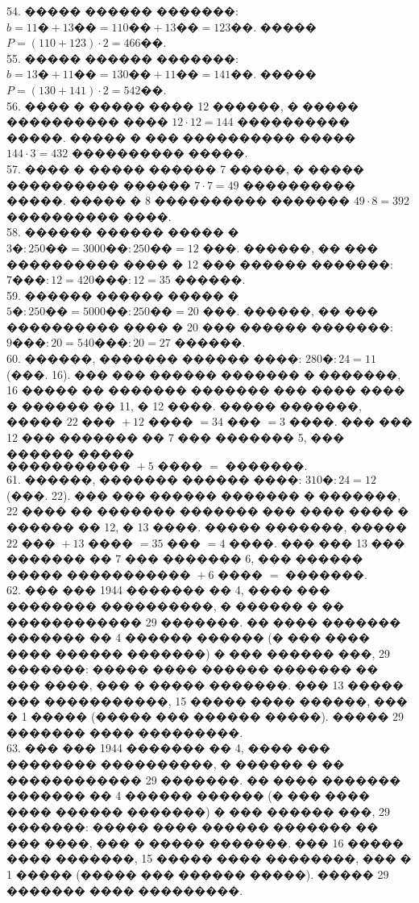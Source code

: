 \documentclass[12pt]{article}
\begin{document}
54. ����� ������ �������: $b=11\text{�}+13\text{��}=110\text{��}+13\text{��}=123$��. ����� $P=(110+123)\cdot2=466$��.\\
55. ����� ������ �������: $b=13\text{�}+11\text{��}=130\text{��}+11\text{��}=141$��. ����� $P=(130+141)\cdot2=542$��.\\
56. ���� � ����� ���� 12 ������, � ����� ���������� ���� $12\cdot12=144$ ���������� �����. ����� � ��� ���������� ����� $144\cdot3=432$ ���������� �����.\\
57. ���� � ����� ������ 7 �����, � ����� ���������� ������ $7\cdot7=49$ ���������� �����. ����� � 8 ���������� ������� $49\cdot8=392$ ���������� ����.\\
58. ������ ������ ����� � $3\text{�}:250\text{��}=3000\text{��}:250\text{��}=12$ ���. ������, �� ��� ���������� ���� � 12 ��� ������ �������: $7\text{���}:12=420\text{���}:12=35$ ������.\\
59. ������ ������ ����� � $5\text{�}:250\text{��}=5000\text{��}:250\text{��}=20$ ���. ������, �� ��� ���������� ���� � 20 ��� ������ �������: $9\text{���}:20=540\text{���}:20=27$ ������.\\
60. ������, ������� ������ ����: $280\text{�}:24=11$(���. 16). ��� ��� ������ ������� � �������, 16 ����� �� ������� ������� ��� ���� ���� � ������ �� 11, � 12 ����. ����� �������, ����� $22\text{ ��� }+12\text{ ���� }=34\text{ ��� }=3\text{ ����}.$ ��� ��� 12 ��� ������� �� 7 ��� ������� 5, ��� ������ ����� $\text{����������� }+5\text{ ���� }=\text{ �������.}$\\
61. ������, ������� ������ ����: $310\text{�}:24=12$(���. 22). ��� ��� ������ ������� � �������, 22 ���� �� ������� ������� ��� ���� ���� � ������ �� 12, � 13 ����. ����� �������, ����� $22\text{ ��� }+13\text{ ���� }=35\text{ ��� }=4\text{ ����}.$ ��� ��� 13 ��� ������� �� 7 ��� ������� 6, ��� ������ ����� $\text{����������� }+6\text{ ���� }=\text{ �������.}$\\
62. ��� ��� 1944 ������� �� 4, ���� ��� �������� ����������, � ������ � �� ������������ 29 �������. �� ���� ������� ������� �� 4 ������ ������ (� ��� ���� ���� ������ �������) � ��� ������ ���, 29 �������: ����� ���� ������ ������� �� ��� ����, ��� � ����� �������. ��� 13 ����� ��� �����������, 15 ����� ���� ������, ��� � 1 ����� (����� ��� ������ �����). ����� 29 ������� ���� ���������.\\
63. ��� ��� 1944 ������� �� 4, ���� ��� �������� ����������, � ������ � �� ������������ 29 �������. �� ���� ������� ������� �� 4 ������ ������ (� ��� ���� ���� ������ �������) � ��� ������ ���, 29 �������: ����� ���� ������ ������� �� ��� ����, ��� � ����� �������. ��� 16 ����� ���� �������, 15 ����� ���� ��������, ��� � 1 ����� (����� ��� ������ �����). ����� 29 ������� ���� ���������.\\
\end{document}
